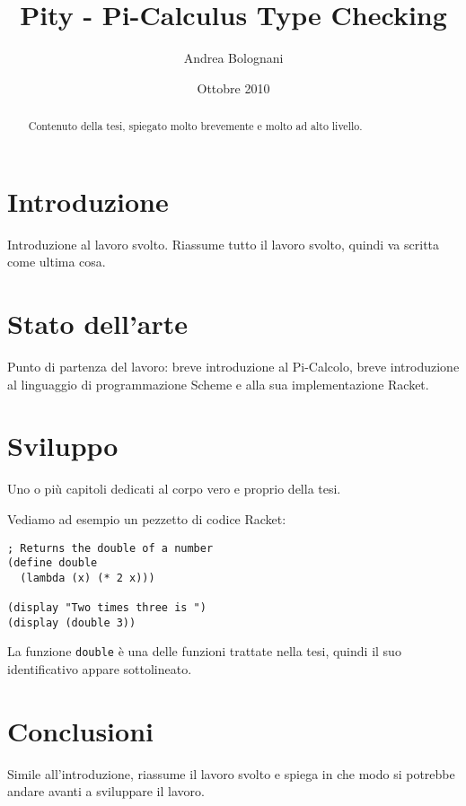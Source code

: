 \documentclass[a4paper]{article}
\begin{document}
\title{Pity - Pi-Calculus Type Checking}
\author{Andrea Bolognani}
\date{Ottobre 2010}

\maketitle


\begin{abstract}
Contenuto della tesi, spiegato molto brevemente e molto ad alto livello.
\end{abstract}


\clearpage

\tableofcontents

\clearpage


\section{Introduzione}

Introduzione al lavoro svolto. Riassume tutto il lavoro svolto, quindi
va scritta come ultima cosa.


\section{Stato dell'arte}

Punto di partenza del lavoro: breve introduzione al Pi-Calcolo, breve
introduzione al linguaggio di programmazione Scheme e alla sua
implementazione Racket.


\section{Sviluppo}

Uno o pi\`u capitoli dedicati al corpo vero e proprio della tesi.

Vediamo ad esempio un pezzetto di codice Racket:

\begin{lstlisting}
; Returns the double of a number
(define double
  (lambda (x) (* 2 x)))

(display "Two times three is ")
(display (double 3))
\end{lstlisting}

La funzione \lstinline{double} \`e una delle funzioni trattate nella tesi,
quindi il suo identificativo appare sottolineato.


\section{Conclusioni}

Simile all'introduzione, riassume il lavoro svolto e spiega in che
modo si potrebbe andare avanti a sviluppare il lavoro.
\end{document}
